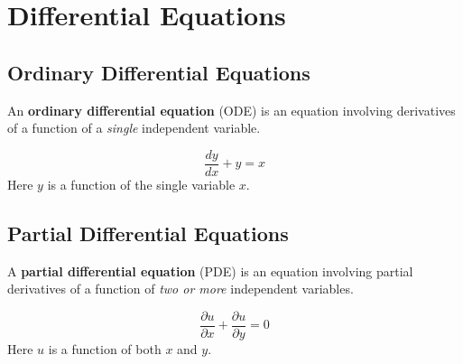 \chapter{Differential Equations}

\section{Ordinary Differential Equations}

\begin{definition}
An \textbf{ordinary differential equation} (ODE) is an equation involving derivatives of a function of a \emph{single} independent variable.
\end{definition}

\begin{example}
\[
  \frac{dy}{dx} + y = x
\]
Here $y$ is a function of the single variable $x$.
\end{example}

\section{Partial Differential Equations}

\begin{definition}
A \textbf{partial differential equation} (PDE) is an equation involving partial derivatives of a function of \emph{two or more} independent variables.
\end{definition}

\begin{example}
\[
  \frac{\partial u}{\partial x} + \frac{\partial u}{\partial y} = 0
\]
Here $u$ is a function of both $x$ and $y$.
\end{example}
